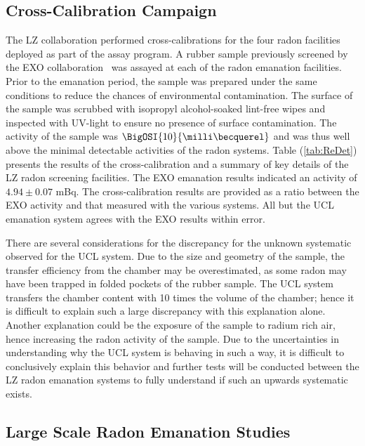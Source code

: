 \subsection{Cross-Calibration Campaign}
\label{secsec:cross_cal}

The LZ collaboration performed cross-calibrations for the four radon facilities deployed as part of the assay program. A rubber sample previously screened by the EXO collaboration~\cite{Albert:2015nta, Miller:2017tpl} was assayed at each of the radon emanation facilities. Prior to the emanation period, the sample was prepared under the same conditions to reduce the chances of environmental contamination. The surface of the sample was scrubbed with isopropyl alcohol-soaked lint-free wipes and inspected with UV-light to ensure no presence of surface contamination. The activity of the sample was $\BigOSI{10}{\mBq}$ and was thus well above the minimal detectable activities of the radon systems. Table (\ref{tab:ReDet}) presents the results of the cross-calibration and a summary of key details of the LZ radon screening facilities. The EXO emanation results indicated an activity of $4.94\pm0.07$ mBq. The cross-calibration results are provided as a ratio between the EXO activity and that measured with the various systems. All but the UCL emanation system agrees with the EXO results within error.
%

%

There are several considerations for the discrepancy for the unknown systematic observed for the UCL system. Due to the size and geometry of the sample, the transfer efficiency from the chamber may be overestimated, as some radon may have been trapped in folded pockets of the rubber sample. The UCL system transfers the chamber content with 10 times the volume of the chamber; hence it is difficult to explain such a large discrepancy with this explanation alone. Another explanation could be the exposure of the sample to radium rich air, hence increasing the radon activity of the sample. Due to the uncertainties in understanding why the UCL system is behaving in such a way, it is difficult to conclusively explain this behavior and further tests will be conducted between the LZ radon emanation systems to fully understand if such an upwards systematic exists. 


\subsection{Large Scale Radon Emanation Studies}
\label{secsec:large_scale_measurements}

